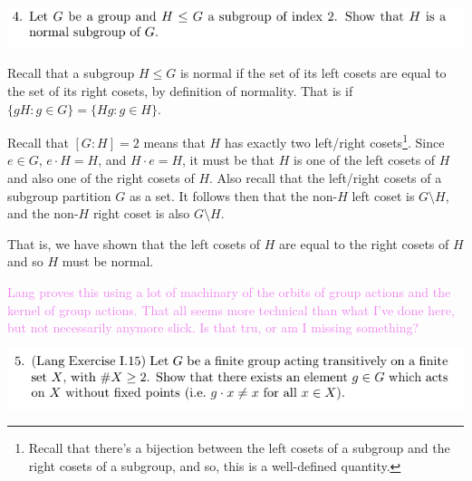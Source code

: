 \documentclass[12pt,letterpaper,boxed]{hmcpset}
\newcommand{\wg}[1]{\textcolor{violet}{#1}}
\begin{document}
\newpage


\begin{problem}
	\includegraphics[scale=0.8]{4.png}
	\hfill
\end{problem}

\begin{solution}
Recall that a subgroup $H \leq G$ is normal if the set of
its left cosets are equal to the set of its right cosets, by
definition of normality. That is if
$\{g H : g \in G\} = \{H g : g \in H\}$. 

Recall that $[G: H] = 2$ means that $H$ has exactly two left/right
cosets\footnote{Recall that there's a bijection between the left
cosets of a subgroup and the right cosets of a subgroup, and so, this
is a well-defined quantity.}. Since $e \in G$, $e \cdot H = H$, and $H
\cdot e = H$, it
must be that $H$ is
one of the left cosets of $H$ and also one of the right cosets of $H$.
Also recall that the left/right cosets of a subgroup partition $G$ as
a set. It follows then that the non-$H$
left coset is $G \setminus H$, and the non-$H$ right coset is also $G
\setminus H$.

That is, we have shown that the left cosets of $H$ are equal to the right cosets of $H$
and so $H$ must be normal. 

\wg{Lang proves this using a lot of machinary of the orbits of group
actions and the kernel of group actions. That all seems more technical
than what I've done here, but not necessarily anymore slick. Is that
tru, or am I missing something?}

\end{solution}

\newpage



\begin{problem}
	\includegraphics[scale=0.8]{5.png}
	\hfill
\end{problem}

\begin{solution}
\end{solution}
\end{document}

